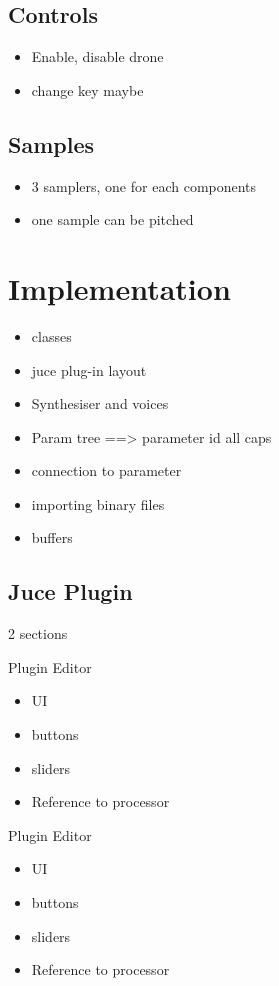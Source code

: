 \documentclass[12pt]{article}
\begin{document}
	\subsection{Controls}
	\begin{itemize}
		\item Enable, disable drone
		\item change key maybe
	\end{itemize}
	
	\subsection{Samples}
	\begin{itemize}
		\item 3 samplers, one for each components
		\item one sample can be pitched
	\end{itemize}
	
		
\section{Implementation}
	
	\begin{itemize}
		\item classes
		\item juce plug-in layout
		\item Synthesiser and voices
		\item Param tree ==> parameter id all caps
		\item connection to parameter
		\item importing binary files
		\item buffers
	\end{itemize}

	\subsection{Juce Plugin}
	2 sections
	
	Plugin Editor
	\begin{itemize}
		\item UI
		\item buttons
		\item sliders
		\item Reference to processor
	\end{itemize}
	
	
	Plugin Editor
	\begin{itemize}
		\item UI
		\item buttons
		\item sliders
		\item Reference to processor
	\end{itemize}
	
\end{document}
